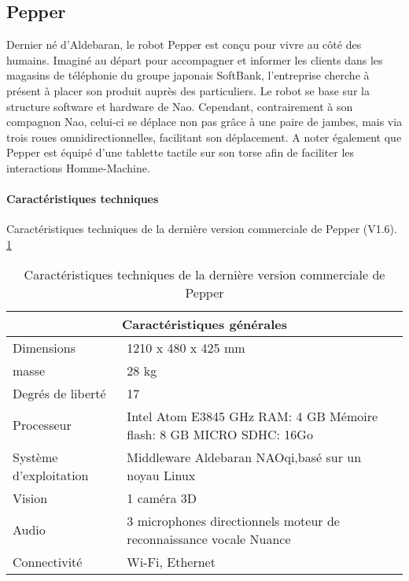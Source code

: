 \subsection{Pepper}
\label{Entreprise: Les produits: Pepper}
Dernier né d'Aldebaran, le robot Pepper est conçu pour vivre au côté des humains. Imaginé au départ pour accompagner et informer les clients dans les magasins de téléphonie du groupe japonais SoftBank, l'entreprise cherche à présent à placer son produit auprès des particuliers. Le robot se base sur la structure software et hardware de Nao. Cependant, contrairement à son compagnon Nao, celui-ci se déplace non pas grâce à une paire de jambes, mais via trois roues omnidirectionnelles, facilitant son déplacement. A noter également que Pepper est équipé d'une tablette tactile sur son torse afin de faciliter les interactions Homme-Machine.

\paragraph{Caractéristiques techniques}
Caractéristiques techniques de la dernière version commerciale de Pepper (V1.6). \ref{tab: Caractéristiques technique de Pepper}

\begin{table}[h]
\begin{tabular}{ | l | p{8cm} | }
	\hline
	\multicolumn{2}{|c|}{Caractéristiques générales} \\
	\hline
	Dimensions & 1210 x 480 x 425 mm \\
	\hline 
	masse & 28 kg \\
	\hline 
	Degrés de liberté  & 17 \\
	\hline
	Processeur & Intel Atom E3845 \newline 1.91 GHz \newline RAM: 4 GB \newline Mémoire flash: 8 GB \newline MICRO SDHC: 16Go  \\
	\hline
	Système d'exploitation & Middleware Aldebaran NAOqi,\newline basé sur un noyau Linux \\
	\hline 
	Vision & 1 caméra 3D \\
	\hline
	Audio & 3 microphones directionnels \newline moteur de reconnaissance vocale Nuance  \\
	\hline
	Connectivité & Wi-Fi, Ethernet \\
	\hline
\end{tabular}
\caption[Caractéristiques technique de Pepper]{Caractéristiques techniques de la dernière version commerciale  de Pepper}
\label {tab: Caractéristiques technique de Pepper}
\end{table}

